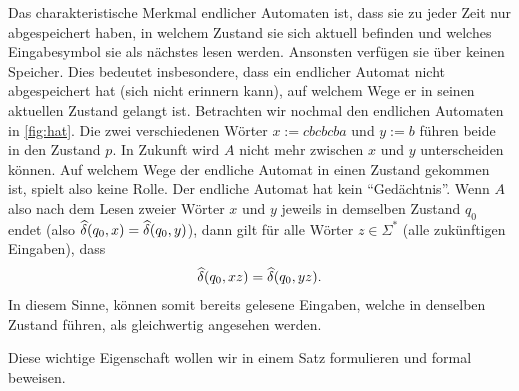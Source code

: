 Das charakteristische Merkmal endlicher Automaten ist, dass sie zu jeder Zeit nur abgespeichert haben, in welchem Zustand sie sich aktuell befinden und welches Eingabesymbol sie als nächstes lesen werden. Ansonsten verfügen sie über keinen Speicher. Dies bedeutet insbesondere, dass ein endlicher Automat nicht abgespeichert hat (sich nicht erinnern kann), auf welchem Wege er in seinen aktuellen Zustand gelangt ist. Betrachten wir nochmal den endlichen Automaten in \cref{fig:hat}. Die zwei verschiedenen Wörter $x:= cbcbcba$ und $y := b$ führen beide in den Zustand $p$. In Zukunft wird $A$ nicht mehr zwischen $x$ und $y$ unterscheiden können. Auf welchem Wege der endliche Automat in einen Zustand gekommen ist, spielt also keine Rolle. Der endliche Automat hat kein \enquote{Gedächtnis}. Wenn $A$ also nach dem Lesen zweier Wörter $x$ und $y$ jeweils in demselben Zustand $q_0$ endet (also $\widehat{\delta}(q_0,x) = \widehat{\delta}(q_0,y)$), dann gilt für alle Wörter $z\in\Sigma^*$ (alle zukünftigen Eingaben), dass
\begin{align*}
	\widehat{\delta}(q_0,xz) = \widehat{\delta}(q_0,yz).
\end{align*}
In diesem Sinne, können somit bereits gelesene Eingaben, welche in denselben Zustand führen, als gleichwertig angesehen werden.

Diese wichtige Eigenschaft wollen wir in einem Satz formulieren und formal beweisen.

